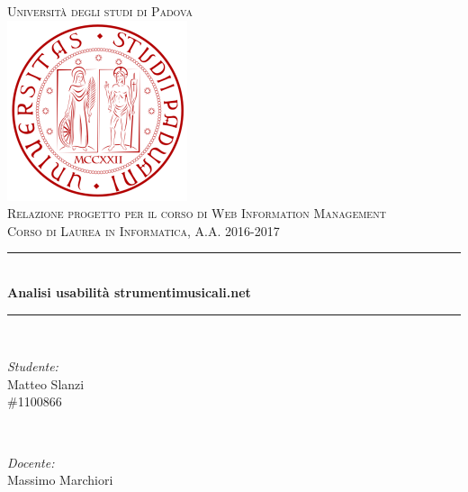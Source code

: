 \documentclass[12pt]{article}
\begin{document}
	\begin{titlepage}
			\newcommand{\HRule}{\rule{\linewidth}{0.5mm}} %
		
		\center %
		
		
		\textsc{\LARGE Università degli studi di Padova}\\[1.5cm] %
		\includegraphics[scale=0.3]{images/unipd_logo.png}\\[1cm] %
		\textsc{\Large Relazione progetto per il corso di Web Information Management}\\[0.5cm] %
		\textsc{\large Corso di Laurea in Informatica, A.A. 2016-2017}\\[0.5cm] %
		
		\HRule \\[0.4cm]
		{ \huge \bfseries Analisi usabilità strumentimusicali.net}\\[0.4cm] %
		\HRule \\[1.5cm]
		
			\begin{minipage}{0.4\textwidth}
				\begin{flushleft} \large
					\emph{Studente:}\\
				 Matteo Slanzi \\ \#1100866
				\end{flushleft}
			\end{minipage}
			~
			\begin{minipage}{0.4\textwidth}
				\begin{flushright} \large
					\emph{Docente:} \\
					Massimo Marchiori
				\end{flushright}
			\end{minipage}\\[2cm]
		

\end{titlepage}
\end{document}

